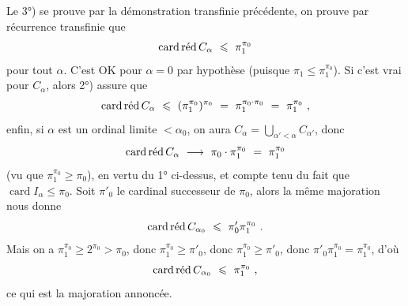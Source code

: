 Le 3°) se prouve par la démonstration transfinie précédente, on prouve par récurrence transfinie que
\[
\cardred C_\alpha \ \leqslant\ \pi_1^{\pi_0}
\]
pour tout $\alpha$. C'est OK pour $\alpha=0$ par hypothèse (puisque $\pi_1\leqslant\pi_1^{\pi_0}$). Si c'est vrai pour $C_\alpha$, alors 2°) assure que
\[
\cardred C_\alpha \ \leqslant\ (\pi_1^{\pi_0})^{\pi_0} \ =\ \pi_1^{\pi_0\cdot\pi_0} \ =\ \pi_1^{\pi_0}\ , %
\]
enfin, si $\alpha$ est un ordinal limite $<\alpha_0$, on aura $C_\alpha=\bigcup_{\alpha'<\alpha}C_{\alpha'}$, donc
\[
\cardred C_\alpha \ \longrightarrow\ \pi_0\cdot\pi_1^{\pi_0} \ =\ \pi_1^{\pi_0} %
\]
(vu que $\pi_1^{\pi_0}\geqslant\pi_0$), en vertu du 1° ci-dessus, et compte tenu du fait que $\operatorname{card}I_\alpha\leqslant\pi_0$. Soit $\pi'_0$ le cardinal successeur de $\pi_0$, alors la même majoration nous donne
\[
\cardred C_{\alpha_0} \ \leqslant\ \pi'_0\pi_1^{\pi_0}\ .
\]
Mais on a $\pi_1^{\pi_0}\geqslant2^{\pi_0}>\pi_0$, donc $\pi_1^{\pi_0}\geqslant\pi'_0$, donc $\pi_1^{\pi_0}\geqslant\pi'_0$, donc $\pi'_0\pi_1^{\pi_0}=\pi_1^{\pi_0}$, d'où
\[
\cardred C_{\alpha_0} \ \leqslant\ \pi_1^{\pi_0}\ ,
\]
ce qui est la majoration annoncée.


